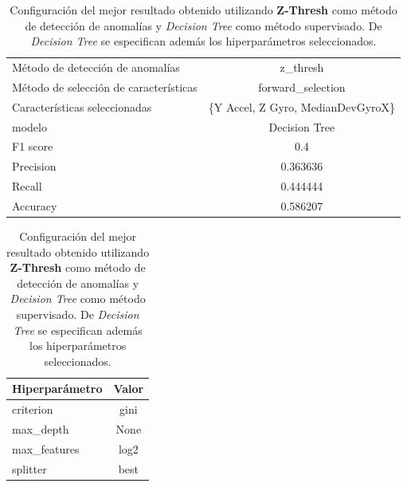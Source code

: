 \begin{appendices}
		\begin{table}[htb]
			\centering
			\caption{Configuración del mejor resultado obtenido utilizando \textbf{Z-Thresh} como método de detección de anomalías y \emph{Decision Tree}
			como método supervisado. De \emph{Decision Tree} se especifican además los hiperparámetros seleccionados.}
			\label{table:21}
			\begin{tabular}{lc}
				\toprule
					  Método de detección de anomalías &                          z\_thresh \\
				Método de selección de características &                 forward\_selection \\
						 Características seleccionadas & \{Y Accel, Z Gyro, MedianDevGyroX\} \\
												modelo &                     Decision Tree \\
											  F1 score &                               0.4 \\
											 Precision &                          0.363636 \\
												Recall &                          0.444444 \\
											  Accuracy &                          0.586207 \\
				\bottomrule
				\end{tabular}
			\newline
			\newline

			\begin{tabular}{lc}
				\toprule
				Hiperparámetro & Valor \\
				\midrule
					 criterion &  gini \\
					 max\_depth &  None \\
				  max\_features &  log2 \\
					  splitter &  best \\
				\bottomrule
			\end{tabular}
			
		\end{table}


\end{appendices}

